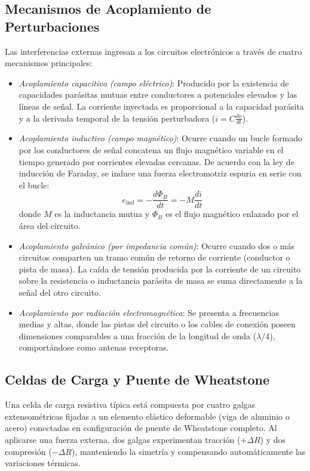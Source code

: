 \subsection{Mecanismos de Acoplamiento de Perturbaciones}
Las interferencias externas ingresan a los circuitos electrónicos a través de cuatro mecanismos principales:
\begin{itemize}
    \item \emph{Acoplamiento capacitivo (campo eléctrico)}: Producido por la existencia de capacidades parásitas
    mutuas entre conductores a potenciales elevados y las líneas de señal. La corriente inyectada es proporcional a la
    capacidad parásita y a la derivada temporal de la tensión perturbadora ($i = C \frac{dv}{dt}$).
    \item \emph{Acoplamiento inductivo (campo magnético)}: Ocurre cuando un bucle formado por los conductores de señal
    concatena un flujo magnético variable en el tiempo generado por corrientes elevadas cercanas. De acuerdo con la ley
    de inducción de Faraday, se induce una fuerza electromotriz espuria en serie con el bucle:
    \begin{equation}
        e_{\text{ind}} = -\frac{d\Phi_B}{dt} = -M \frac{di}{dt}
        \label{eq.ej3:induccion_faraday}
    \end{equation}
    donde $M$ es la inductancia mutua y $\Phi_B$ es el flujo magnético enlazado por el área del circuito.
    \item \emph{Acoplamiento galvánico (por impedancia común)}: Ocurre cuando dos o más circuitos comparten un tramo
    común de retorno de corriente (conductor o pista de masa). La caída de tensión producida por la corriente de un
    circuito sobre la resistencia o inductancia parásita de masa se suma directamente a la señal del otro circuito.
    \item \emph{Acoplamiento por radiación electromagnética}: Se presenta a frecuencias medias y altas, donde las
    pistas del circuito o los cables de conexión poseen dimensiones comparables a una fracción de la longitud de onda
    ($\lambda/4$), comportándose como antenas receptoras.
\end{itemize}

\subsection{Celdas de Carga y Puente de Wheatstone}
Una celda de carga resistiva típica está compuesta por cuatro galgas extensométricas fijadas a un elemento elástico
deformable (viga de aluminio o acero) conectadas en configuración de puente de Wheatstone completo. Al aplicarse una
fuerza externa, dos galgas experimentan tracción ($+\Delta R$) y dos compresión ($-\Delta R$), manteniendo la simetría
y compensando automáticamente las variaciones térmicas.

